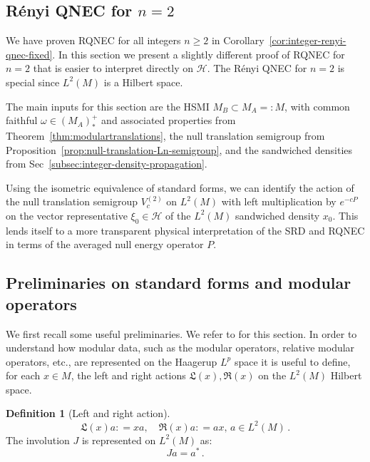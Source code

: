 \documentclass[11pt,a4paper]{article}
\theoremstyle{plain}
\numberwithin{theorem}{section}
\theoremstyle{definition}
\newtheorem{definition}[theorem]{Definition}
\newcommand{\?}{\overset{?}{=}}
\newcommand{\defeq}{\mathrel{\mathop:}=}
\begin{document}
\begin{appendix}
\section{R\'enyi QNEC for \texorpdfstring{$n=2$}{n=2}}
\label{subsec:alpha-two-rigorous}

We have proven RQNEC for all integers $n\geq2$ in Corollary~\ref{cor:integer-renyi-qnec-fixed}. In this section we present a slightly different proof of RQNEC for $n=2$ that is easier to interpret directly on $\mathcal H$.
The R\'enyi QNEC for $n=2$ is special since $L^2(M)$ is a Hilbert space. 

The main inputs for this section are the HSMI $M_B\subset M_A=: M$, with common faithful $\omega\in (M_A)_*^+$ and associated properties from Theorem~\ref{thm:modulartranslations}, the null translation semigroup from Proposition~\ref{prop:null-translation-Ln-semigroup}, and the sandwiched densities from Sec~\ref{subsec:integer-density-propagation}.

Using the isometric equivalence of standard forms, we can identify the action of the null translation semigroup $V_c^{(2)}$ on $L^2(M)$ with left multiplication by $e^{-cP}$ on the vector representative $\xi_0 \in \mathcal H$ of the $L^2(M)$ sandwiched density $x_0$. This lends itself to a more transparent physical interpretation of the SRD and RQNEC in terms of the averaged null energy operator $P$.

\subsection{Preliminaries on standard forms and modular operators}

We first recall some useful preliminaries. We refer to \cite{Hiai:2021qfv} for this section.
In order to understand how modular data, such as the modular operators, relative modular operators, etc., are represented on the Haagerup $L^p$ space it is useful to define, for each $x\in M$, the left and right actions $\mathfrak L(x), \mathfrak R(x)$ on the $L^2(M)$ Hilbert space.
\begin{definition}[Left and right action]
    \[
        \mathfrak L(x) a \defeq x a, \quad \mathfrak R(x) a \defeq ax, \, a\in L^2(M)\,.
    \]
    The involution $J$ is represented on $L^2(M)$ as: 
    \[
        Ja=a^*\,.
    \]
\end{definition}


\end{appendix}
\end{document}
